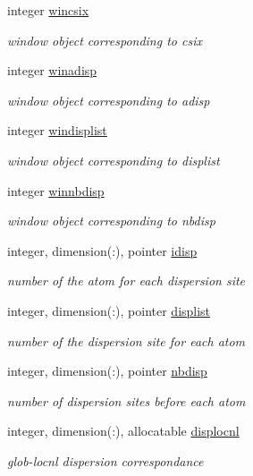 \begin{DoxyCompactItemize}
integer \hyperlink{classdisp_aa37195cc4b48e320220322d2ce2cf5e5}{wincsix}
\begin{DoxyCompactList}\small\item\em window object corresponding to csix \end{DoxyCompactList}\item 
integer \hyperlink{classdisp_a496a52cc2d07a7b14d8febbd3975567b}{winadisp}
\begin{DoxyCompactList}\small\item\em window object corresponding to adisp \end{DoxyCompactList}\item 
integer \hyperlink{classdisp_a020abc5d4a3b714acb851b69b931668e}{windisplist}
\begin{DoxyCompactList}\small\item\em window object corresponding to displist \end{DoxyCompactList}\item 
integer \hyperlink{classdisp_ade4be59b02f8bc365b1af045f304bf87}{winnbdisp}
\begin{DoxyCompactList}\small\item\em window object corresponding to nbdisp \end{DoxyCompactList}\item 
integer, dimension(\-:), pointer \hyperlink{classdisp_ad3a93472ef6cc24709220caea547db6f}{idisp}
\begin{DoxyCompactList}\small\item\em number of the atom for each dispersion site \end{DoxyCompactList}\item 
integer, dimension(\-:), pointer \hyperlink{classdisp_a5e4e29125e6b9523897ffbf9a812fb2c}{displist}
\begin{DoxyCompactList}\small\item\em number of the dispersion site for each atom \end{DoxyCompactList}\item 
integer, dimension(\-:), pointer \hyperlink{classdisp_a37d2da77942166e101d189c2ee6b4f8d}{nbdisp}
\begin{DoxyCompactList}\small\item\em number of dispersion sites before each atom \end{DoxyCompactList}\item 
integer, dimension(\-:), allocatable \hyperlink{classdisp_a4ecfe2ba143fd63d6c823145aa81da9d}{displocnl}
\begin{DoxyCompactList}\small\item\em glob-\/locnl dispersion correspondance \end{DoxyCompactList}\item 

\end{DoxyCompactItemize}
